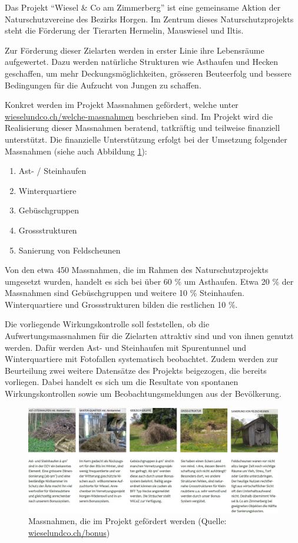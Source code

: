 \documentclass[
  oneside]{scrbook}
\providecommand{\tightlist}{%
  \setlength{\itemsep}{0pt}\setlength{\parskip}{0pt}}
\begin{document}
Das Projekt ``Wiesel \& Co am Zimmerberg'' ist eine gemeinsame Aktion der Naturschutzvereine des Bezirks Horgen. Im Zentrum dieses Naturschutzprojekts steht die Förderung der Tierarten Hermelin, Mauswiesel und Iltis.

Zur Förderung dieser Zielarten werden in erster Linie ihre Lebensräume aufgewertet. Dazu werden natürliche Strukturen wie Asthaufen und Hecken geschaffen, um mehr Deckungsmöglichkeiten, grösseren Beuteerfolg und bessere Bedingungen für die Aufzucht von Jungen zu schaffen.

Konkret werden im Projekt Massnahmen gefördert, welche unter \href{https://wieselundco.ch/welche-massnahmen}{wieselundco.ch/welche-massnahmen} beschrieben sind. Im Projekt wird die Realisierung dieser Massnahmen beratend, tatkräftig und teilweise finanziell unterstützt. Die finanzielle Unterstützung erfolgt bei der Umsetzung folgender Massnahmen (siehe auch Abbildung \ref{fig:massnahmen}):

\begin{enumerate}
\def\labelenumi{\arabic{enumi}.}
\tightlist
\item
  Ast- / Steinhaufen
\item
  Winterquartiere
\item
  Gebüschgruppen
\item
  Grossstrukturen
\item
  Sanierung von Feldscheunen
\end{enumerate}

Von den etwa 450 Massnahmen, die im Rahmen des Naturschutzprojekts umgesetzt wurden, handelt es sich bei über 60 \% um Asthaufen. Etwa 20 \% der Massnahmen sind Gebüschgruppen und weitere 10 \% Steinhaufen. Winterquartiere und Grossstrukturen bilden die restlichen 10 \%.

Die vorliegende Wirkungskontrolle soll feststellen, ob die Aufwertungsmassnahmen für die Zielarten attraktiv sind und von ihnen genutzt werden. Dafür werden Ast- und Steinhaufen mit Spurentunnel und Winterquartiere mit Fotofallen systematisch beobachtet. Zudem werden zur Beurteilung zwei weitere Datensätze des Projekts beigezogen, die bereits vorliegen. Dabei handelt es sich um die Resultate von spontanen Wirkungskontrollen sowie um Beobachtungsmeldungen aus der Bevölkerung.



\begin{figure}[H]
\includegraphics[width=1\linewidth]{images/massnahmen} \caption{Massnahmen, die im Projekt gefördert werden (Quelle: \href{http://www.wieselundco.ch/bonus}{wieselundco.ch/bonus})}\label{fig:massnahmen}
\end{figure}
\end{document}
